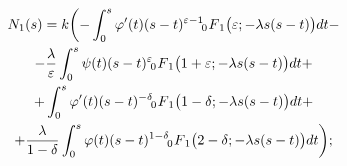 \begin{multline}

 N_1(s) = k\biggl( -\int _0^s \varphi'(t) (s-t)^{\varepsilon-1}  \,\,

F_{\hspace{-4mm}0 \hspace{3mm}1} \bigl(\varepsilon;-\lambda s (s-t)\bigr) dt -

\\

- \frac{\lambda}{\varepsilon}

\int _0^s \psi(t) (s-t)^{\varepsilon}  \,\,

F_{\hspace{-4mm}0 \hspace{3mm}1} \bigl(1+\varepsilon;-\lambda s (s-t)\bigr) dt +

\\

+

 \int _0^s \varphi'(t) (s-t)^{-\delta}  \,\,

F_{\hspace{-4mm}0 \hspace{3mm}1} \bigl(1-\delta;-\lambda s (s-t)\bigr) dt +

\\

\label{dolg:eq20}

 +  \frac{\lambda}{1-\delta}

\int _0^s \varphi(t) (s-t)^{1-\delta} \,\,

F_{\hspace{-4mm}0 \hspace{3mm}1} \bigl(2-\delta;-\lambda s (s-t)\bigr) dt \biggr);

\end{multline}


